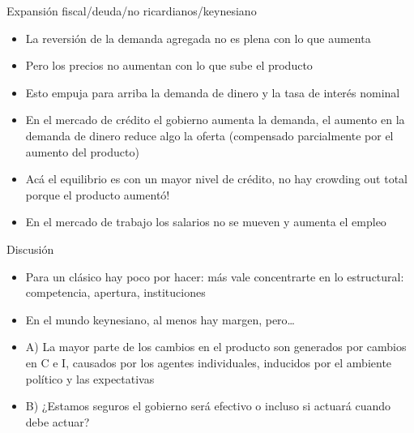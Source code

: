 \documentclass{beamer}
\begin{document}
\begin{frame}{Expansión fiscal/deuda/no ricardianos/keynesiano}
   
\begin{itemize}
\item La reversión de la demanda agregada no es plena con lo que aumenta 
\item Pero los precios no aumentan con lo que sube el producto
\item Esto empuja para arriba la demanda de dinero y la tasa de interés nominal
\item En el mercado de crédito el gobierno aumenta la demanda, el aumento en la demanda de dinero reduce algo la oferta (compensado parcialmente por el aumento del producto) 
\item Acá el equilibrio es con un mayor nivel de crédito, no hay crowding out total porque el producto aumentó! 
\item En el mercado de trabajo los salarios no se mueven y aumenta el empleo  
\end{itemize}
\end{frame}


\begin{frame}{Discusión}

    \begin{itemize}
    \item Para un clásico hay poco por hacer: más vale concentrarte en lo estructural: competencia, apertura, instituciones
    \item En el mundo keynesiano, al menos hay margen, pero…
    \item A) La mayor parte de los cambios en el producto son generados por cambios en C e I, causados por los agentes individuales, inducidos por el ambiente político y las expectativas
    \item B) ¿Estamos seguros el gobierno será efectivo o incluso si actuará cuando debe actuar? 
    \end{itemize}

\end{frame}

\end{document}

